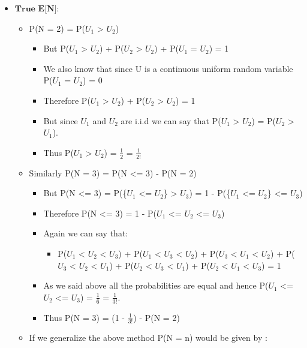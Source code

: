 \documentclass[11pt]{article}
\providecommand{\tightlist}{%
      \setlength{\itemsep}{0pt}\setlength{\parskip}{0pt}}
\begin{document}
    \begin{itemize}
\item
  \(\textbf{True E[N]}\):

  \begin{itemize}
  \item
    P(N = 2) = P(\(U_1\) \textgreater{} \(U_2\))

    \begin{itemize}
    \item
      But P(\(U_1\) \textgreater{} \(U_2\)) + P(\(U_2\) \textgreater{}
      \(U_2\)) + P(\(U_1\) = \(U_2\)) = 1
    \item
      We also know that since U is a continuous uniform random variable
      P(\(U_1\) = \(U_2\)) = 0
    \item
      Therefore P(\(U_1\) \textgreater{} \(U_2\)) + P(\(U_2\)
      \textgreater{} \(U_2\)) = 1
    \item
      But since \(U_1\) and \(U_2\) are i.i.d we can say that P(\(U_1\)
      \textgreater{} \(U_2\)) = P(\(U_2\) \textgreater{} \(U_1\)).
    \item
      Thus P(\(U_1\) \textgreater{} \(U_2\)) = \(\frac{1}{2}\) =
      \(\frac{1}{2!}\)
    \end{itemize}
  \item
    Similarly P(N = 3) = P(N \textless{}= 3) - P(N = 2)

    \begin{itemize}
    \item
      But P(N \textless{}= 3) = P(\{\(U_1\) \textless{}= \(U_2\)\}
      \textgreater{} \(U_3\)) = 1 - P(\{\(U_1\) \textless{}= \(U_2\)\}
      \textless{}= \(U_3\))
    \item
      Therefore P(N \textless{}= 3) = 1 - P(\(U_1\) \textless{}= \(U_2\)
      \textless{}= \(U_3\))
    \item
      Again we can say that:

      \begin{itemize}
      \tightlist
      \item
        P(\(U_1\) \textless{} \(U_2\) \textless{} \(U_3\)) + P(\(U_1\)
        \textless{} \(U_3\) \textless{} \(U_2\)) + P(\(U_3\) \textless{}
        \(U_1\) \textless{} \(U_2\)) + P(\(U_3\) \textless{} \(U_2\)
        \textless{} \(U_1\)) + P(\(U_2\) \textless{} \(U_3\) \textless{}
        \(U_1\)) + P(\(U_2\) \textless{} \(U_1\) \textless{} \(U_3\)) =
        1
      \end{itemize}
    \item
      As we said above all the probabilities are equal and hence
      P(\(U_1\) \textless{}= \(U_2\) \textless{}= \(U_3\)) =
      \(\frac{1}{6}\) = \(\frac{1}{3!}\).
    \item
      Thus P(N = 3) = (1 - \(\frac{1}{3!}\)) - P(N = 2)
    \end{itemize}
  \item
    If we generalize the above method P(N = n) would be given by :


\end{itemize}
\end{itemize}
\end{document}
